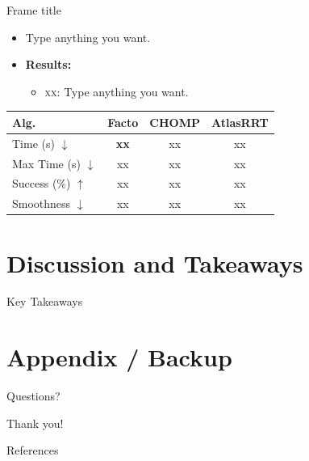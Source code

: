 \documentclass[8pt, compress]{beamer}
\begin{document}
\begin{frame}{Frame title}
\begin{itemize}
  \item Type anything you want.
  \item \textbf{Results:}
  \begin{itemize}
    \item \textsc{xx}: Type anything you want.
  \end{itemize}
\end{itemize}

\medskip
\begin{table}[h]
  \centering
  \begin{tabular}{lccc}
    \toprule
    Alg. & Facto & CHOMP & AtlasRRT \\
    \midrule
    Time (s) $\downarrow$       & \textbf{xx} & xx & xx \\
    Max Time (s) $\downarrow$   & xx & xx  & xx  \\
    Success (\%) $\uparrow$     & xx  & xx  & xx  \\
    Smoothness $\downarrow$     & xx & xx & xx \\
    \bottomrule
  \end{tabular}
\end{table}
\end{frame}


\section{Discussion and Takeaways}

\begin{frame}{Key Takeaways}

\end{frame}

\section{Appendix / Backup}

\appendix

{
\begin{frame}[standout]
  Questions?
\end{frame}
}

\begin{frame}[fragile]{}
    \begin{center}
        \Large Thank you!
    \end{center}
\end{frame}


\begin{frame}[allowframebreaks]{References}

  
  

\end{frame}
\end{document}
